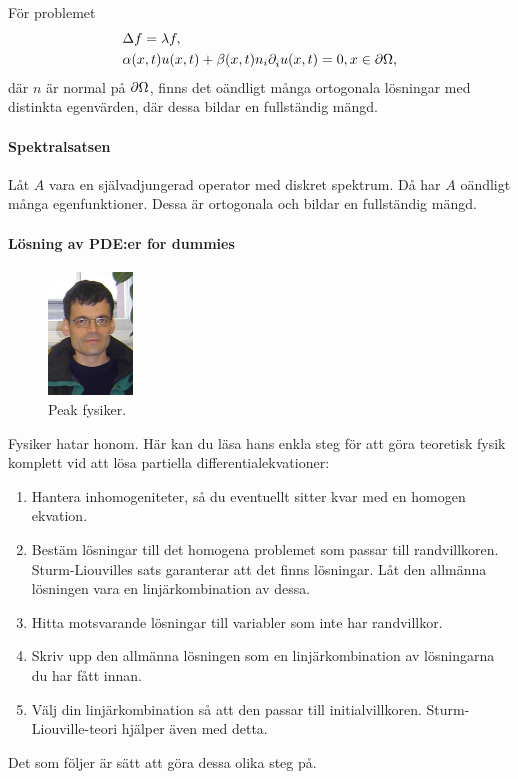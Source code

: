 För problemet
\begin{align*}
	&\Delta f = \lambda f, \\
	&\alpha(x, t)u(x, t) + \beta(x, t)n_{i}\partial_{i}^{}u(x, t) = 0, x\in\partial \Omega,
\end{align*}
där $n$ är normal på $\partial \Omega$, finns det oändligt många ortogonala lösningar med distinkta egenvärden, där dessa bildar en fullständig mängd.

\paragraph{Spektralsatsen}
Låt $A$ vara en självadjungerad operator med diskret spektrum. Då har $A$ oändligt många egenfunktioner. Dessa är ortogonala och bildar en fullständig mängd.

\paragraph{Lösning av PDE:er for dummies}

\begin{figure}[!ht]
	\centering
	\includegraphics[width = 0.2\textwidth]{./Images/langmann.jpg}
	\caption{Peak fysiker.}
	\label{fig:langmann}
\end{figure}

Fysiker hatar honom. Här kan du läsa hans enkla steg för att göra teoretisk fysik komplett vid att lösa partiella differentialekvationer:
\begin{enumerate}
	\item Hantera inhomogeniteter, så du eventuellt sitter kvar med en homogen ekvation.
	\item Bestäm lösningar till det homogena problemet som passar till randvillkoren. Sturm-Liouvilles sats garanterar att det finns lösningar. Låt den allmänna lösningen vara en linjärkombination av dessa.
	\item Hitta motsvarande lösningar till variabler som inte har randvillkor.
	\item Skriv upp den allmänna lösningen som en linjärkombination av lösningarna du har fått innan.
	\item Välj din linjärkombination så att den passar till initialvillkoren. Sturm-Liouville-teori hjälper även med detta.
\end{enumerate}
Det som följer är sätt att göra dessa olika steg på.


